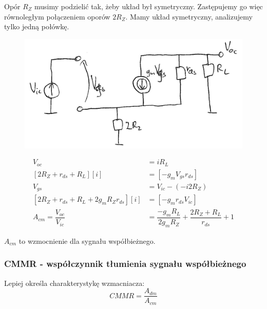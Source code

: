 \documentclass[10pt,a4paper]{article}
\begin{document}
Opór $R_{Z}$ musimy podzielić tak, żeby układ był symetryczny. Zastępujemy go więc równoległym połączeniem oporów $2R_{Z}$. Mamy układ symetryczny, analizujemy tylko jedną połówkę.
\begin{figure}[H]
\centering
\includegraphics[scale=1]{roznicowy_wsp_malosyg}
\end{figure}

\begin{align*}
V_{oc}&=i R_L \\
[2R_{Z}+r_{ds}+R_L][i]&=[-g_{m}V_{gs}r_{ds}] \\
V_{gs}&=V_{ic}-(-i2R_{Z}) \\
[2R_{Z}+r_{ds}+R_L+2g_{m}R_{Z}r_{ds}][i]&=[-g_{m}r_{ds}V_{ic}]\\
A_{cm}=\dfrac{V_{oc}}{V_{ic}}&=\dfrac{-g_{m}R_L}{2g_{m}R_{Z}}+\dfrac{2R_{Z}+R_{L}}{r_{ds}}+1
\end{align*}

$A_{cm}$ to wzmocnienie dla sygnału współbieżnego.

\subsubsection{CMMR - współczynnik tłumienia sygnału współbieżnego}
Lepiej określa charakterystykę wzmacniacza:
\begin{equation}
CMMR=\dfrac{A_{dm}}{A_{cm}}
\end{equation}
\end{document}
